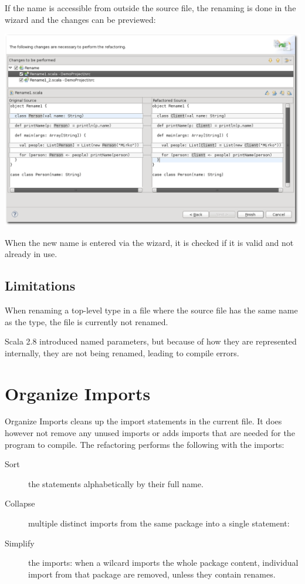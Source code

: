 \documentclass[10pt,a4paper,oneside]{scrreprt}
\begin{document}
If the name is accessible from outside the source file, the renaming is done in the wizard and the changes can be previewed:

\begin{center}
  \includegraphics[width=\linewidth]{rename_screenshot_2.png}
\end{center}

When the new name is entered via the wizard, it is checked if it is valid and not already in use.

\subsection{Limitations}

When renaming a top-level type in a file where the source file has the same name as the type, the file is currently not renamed. 

Scala 2.8 introduced named parameters, but because of how they are represented internally, they are not being renamed, leading to compile errors.

\section{Organize Imports}

Organize Imports cleans up the import statements in the current file. It does however not remove any unused imports or adds imports that are needed for the program to compile. The refactoring performs the following with the imports:

\begin{description}
  \item[Sort] the statements alphabetically by their full name.
  \item[Collapse] multiple distinct imports from the same package into a single statement:
  \item[Simplify] the imports: when a wilcard imports the whole package content, individual import from that package are removed, unless they contain renames.
\end{description}
\end{document}
